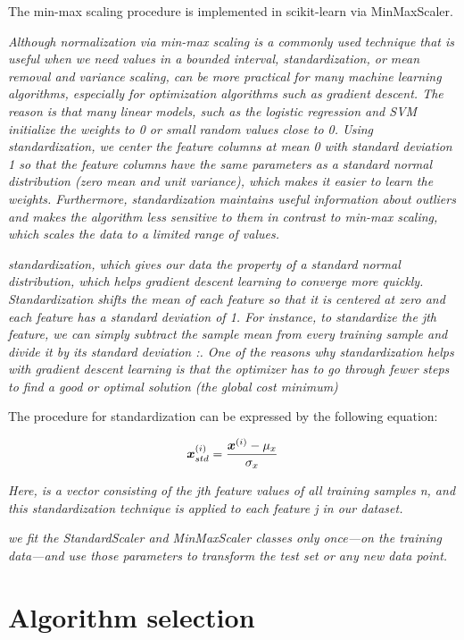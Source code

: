 The min-max scaling procedure is implemented in scikit-learn via MinMaxScaler.

\textit{Although normalization via min-max scaling is a commonly used technique that is useful when we need values in a bounded interval, standardization, or mean removal and variance scaling, can be more practical for many machine learning algorithms, especially for optimization algorithms such as gradient descent. The reason is that many linear models, such as the logistic regression and SVM initialize the weights to 0 or small random values close to 0. Using standardization, we center the feature columns at mean 0 with standard deviation 1 so that the feature columns have the same parameters as a standard normal distribution (zero mean and unit variance), which makes it easier to learn the weights. Furthermore, standardization maintains useful information about outliers and makes the algorithm less sensitive to them in contrast to min-max scaling, which scales the data to a limited range of values.}

\textit{standardization, which gives our data the property of a standard normal distribution, which helps gradient descent learning to converge more quickly. Standardization shifts the mean of each feature so that it is centered at zero and each feature has a standard deviation of 1. For instance, to standardize the jth feature, we can simply subtract the sample mean  from every training sample and divide it by its standard deviation :. One of the reasons why standardization helps with gradient descent learning is that the optimizer has to go through fewer steps to find a good or optimal solution (the global cost minimum)}

The procedure for standardization can be expressed by the following equation:

\begin{equation} \label{eq:standardization}
    \boldsymbol{x}^{(i)}_{std} = \frac{\boldsymbol{x}^{(i)} - \mu_x}{\sigma_x}
\end{equation}

\textit{Here,  is a vector consisting of the jth feature values of all training samples n, and this standardization technique is applied to each feature j in our dataset.}

\textit{we fit the StandardScaler and MinMaxScaler classes only once—on the training data—and use those parameters to transform the test set or any new data point.}

\section{Algorithm selection} \label{sec:algorithm_selection}

